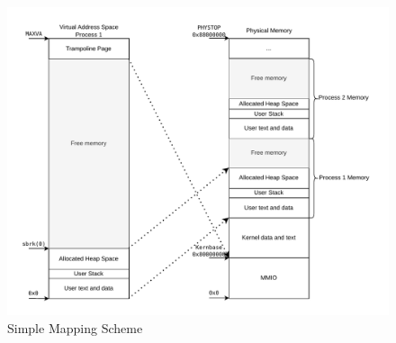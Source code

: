 \begin{figure}[ht!]
    \centering
    \includegraphics[]{figures/simple_mapping.pdf}

    \caption[Simple Mapping Scheme]{Simple Mapping Scheme}
    \label{fig:theory:simplemapping}
\end{figure}
